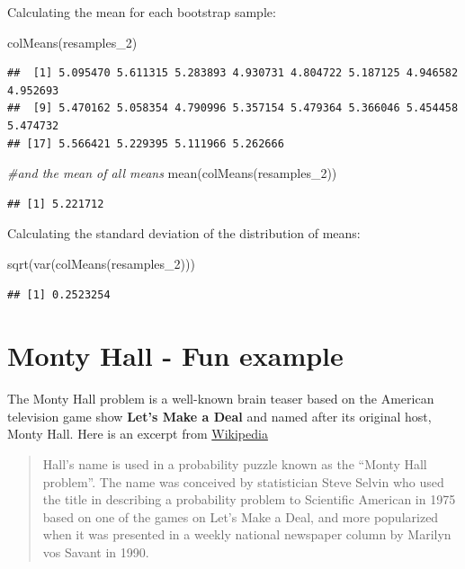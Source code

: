 \documentclass[
]{book}
\newenvironment{Shaded}{\begin{snugshade}}{\end{snugshade}}
\newcommand{\CommentTok}[1]{\textcolor[rgb]{0.56,0.35,0.01}{\textit{#1}}}
\newcommand{\FunctionTok}[1]{\textcolor[rgb]{0.00,0.00,0.00}{#1}}
\newcommand{\NormalTok}[1]{#1}
\begin{document}
Calculating the mean for each bootstrap sample:

\begin{Shaded}
\begin{Highlighting}[]
\FunctionTok{colMeans}\NormalTok{(resamples\_2)}
\end{Highlighting}
\end{Shaded}

\begin{verbatim}
##  [1] 5.095470 5.611315 5.283893 4.930731 4.804722 5.187125 4.946582 4.952693
##  [9] 5.470162 5.058354 4.790996 5.357154 5.479364 5.366046 5.454458 5.474732
## [17] 5.566421 5.229395 5.111966 5.262666
\end{verbatim}

\begin{Shaded}
\begin{Highlighting}[]
\CommentTok{\#and the mean of all means}
\FunctionTok{mean}\NormalTok{(}\FunctionTok{colMeans}\NormalTok{(resamples\_2))}
\end{Highlighting}
\end{Shaded}

\begin{verbatim}
## [1] 5.221712
\end{verbatim}

Calculating the standard deviation of the distribution of means:

\begin{Shaded}
\begin{Highlighting}[]
\FunctionTok{sqrt}\NormalTok{(}\FunctionTok{var}\NormalTok{(}\FunctionTok{colMeans}\NormalTok{(resamples\_2)))}
\end{Highlighting}
\end{Shaded}

\begin{verbatim}
## [1] 0.2523254
\end{verbatim}

\hypertarget{monty-hall---fun-example}{%
\section{Monty Hall - Fun example}\label{monty-hall---fun-example}}

The Monty Hall problem is a well-known brain teaser based on the American television game show \textbf{Let's Make a Deal} and named after its original host, Monty Hall. Here is an excerpt from \href{https://en.wikipedia.org/wiki/Monty_Hall}{Wikipedia}

\begin{quote}
Hall's name is used in a probability puzzle known as the ``Monty Hall problem''. The name was conceived by statistician Steve Selvin who used the title in describing a probability problem to Scientific American in 1975 based on one of the games on Let's Make a Deal, and more popularized when it was presented in a weekly national newspaper column by Marilyn vos Savant in 1990.
\end{quote}
\end{document}
